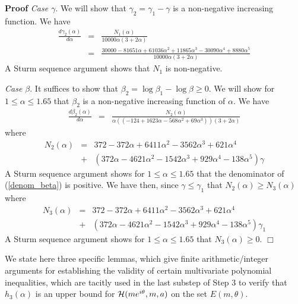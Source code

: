 \documentclass[12pt]{article}
\begin{document}
\textbf{Proof} \emph{Case $\gamma$}. We will show that $\gamma_2 = \gamma_1 - \gamma$ is a non-negative increasing function.  We have
\begin{eqnarray*}
\frac{d \gamma_2(\alpha)}{d\alpha} &=& \frac{N_1(\alpha)}{10000\alpha(3+2\alpha)} \\ 
      &=& \frac{30000-81651\alpha+61036\alpha^2+11865\alpha^3-30090\alpha^4+8880\alpha^5}{10000\alpha(3+2\alpha)}
\end{eqnarray*}
A Sturm sequence argument shows that $N_1$ is non-negative.

\vspace{0.05in}

\emph{Case $\beta$}. It suffices to show that $\beta_2 = \log \beta_1 - \log \beta \ge 0$.  We will show for $1 \le \alpha \le 1.65$ 
that $\beta_2$ is a non-negative increasing function of $\alpha$.  
We have 
\begin{eqnarray} \label{denom_beta}
\frac{d \beta_2(\alpha)}{d\alpha} &=& \frac{N_2(\alpha)}{\alpha((-124+1623\alpha-568\alpha^2+69\alpha^3))(3+2\alpha)}
\end{eqnarray}
where
\begin{eqnarray*} 
N_2(\alpha) &=& 372-372\alpha+6411\alpha^2-3562\alpha^3+621\alpha^4 \\
            &+& (372\alpha-4621\alpha^2-1542\alpha^3+929\alpha^4-138\alpha^5)\gamma
\end{eqnarray*}
A Sturm sequence argument shows for $1 \le \alpha \le 1.65$ that the denominator of (\ref{denom_beta}) is positive.  
We have then, since $\gamma \le \gamma_1$ that $N_2(\alpha) \ge N_3(\alpha)$ where
\begin{eqnarray*} 
N_3(\alpha) &=& 372-372\alpha+6411\alpha^2-3562\alpha^3+621\alpha^4 \\
            &+& (372\alpha-4621\alpha^2-1542\alpha^3+929\alpha^4-138\alpha^5)\gamma_1
\end{eqnarray*}
A Sturm sequence argument shows for $1 \le \alpha \le 1.65$ that $N_3(\alpha) \ge 0$. $\Box$

\vspace{0.05in}

We state here three specific lemmas, which give finite arithmetic/integer arguments for establishing the validity of certain multivariate polynomial inequalities, which are tacitly used in the last substep of Step 3 to verify that $h_3(\alpha)$ is an upper bound for ${\cal H}(me^{i\theta},m,a)$ on the set $E(m,\theta)$.
\end{document}
